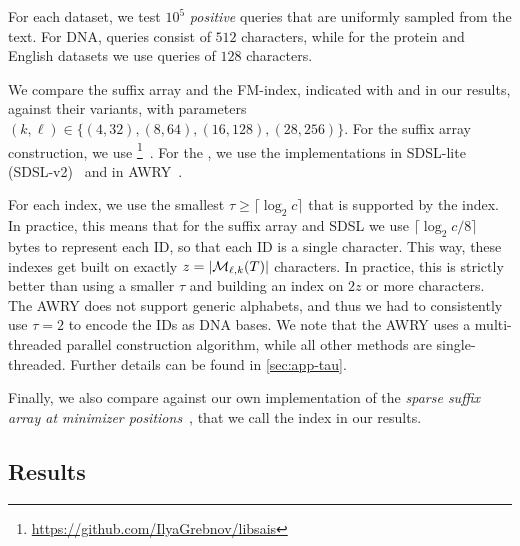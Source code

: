  For each dataset, we test $10^5$ \emph{positive} queries that
are uniformly sampled from the text. For DNA, queries consist of $512$ characters,
while for the protein and English datasets we use queries of $128$ characters.

We compare the suffix array and the FM-index, indicated with {\sa} and {\fmindex} in our results, against their
{\uindex} variants, with parameters $(k,\ell)\in \{(4,32), (8,64), (16,128), (28,256)\}$.
For the suffix array construction, we use
\footnote{\url{https://github.com/IlyaGrebnov/libsais}}~\cite{nong2010two,karkkainen2009permuted}.
For the {\fmindex}, we use the implementations in SDSL-lite
(SDSL-v2)~\cite{gog2014theory} and in AWRY~\cite{anderson2021optimized}.


For each index, we use the smallest $\tau\geq \lceil\log_2 c \rceil$ that is supported by
the index. In practice, this means that for the suffix array and SDSL {\fmindex}
we use $\lceil \log_2 c /8\rceil$ bytes to represent each ID, so that each ID is
a single character. This way, these indexes get built on exactly $z=|\mathcal{M}_{\ell,k}(T)|$ characters.
In practice, this is strictly better than using a smaller $\tau$ and building an
index on $2z$ or more characters.
The AWRY {\fmindex} does not support generic alphabets, and thus we had to consistently
use $\tau=2$ to encode the IDs as DNA bases. We note that the AWRY uses a
multi-threaded parallel construction algorithm, while all other methods are
single-threaded.
Further details can be found in \cref{sec:app-tau}.

Finally, we also compare against our own implementation of the \emph{sparse suffix array at minimizer
positions}~\cite{DBLP:journals/spe/GrabowskiR17}, that we call the {\sindex} index in our results.

\subsection{Results}\label{sec:evaluation}

